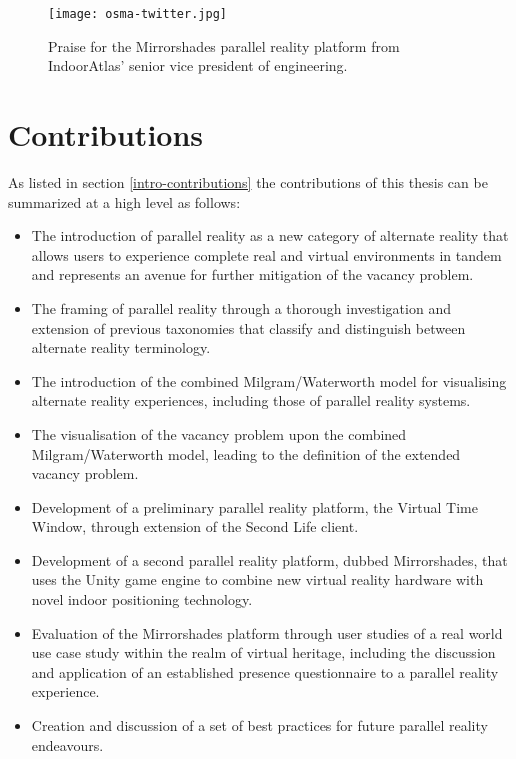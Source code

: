 \begin{figure}[t]
	\begin{center}
		\texttt{[image: osma-twitter.jpg]}
		\caption{Praise for the Mirrorshades parallel reality platform from IndoorAtlas' senior vice president of engineering.}
		\label{osma-twitter.jpg}
	\end{center}	
\end{figure}


\section{Contributions}

As listed in section \ref{intro-contributions} the contributions of this thesis can be summarized at a high level as follows:

\begin{itemize}
	\item The introduction of parallel reality as a new category of alternate reality that allows users to experience complete real and virtual environments in tandem and represents an avenue for further mitigation of the vacancy problem.
	\item The framing of parallel reality through a thorough investigation and extension of previous taxonomies that classify and distinguish between alternate reality terminology.
	\item The introduction of the combined Milgram/Waterworth model for visualising alternate reality experiences, including those of parallel reality systems.
	\item The visualisation of the vacancy problem upon the combined Milgram/Waterworth model, leading to the definition of the extended vacancy problem.
	\item Development of a preliminary parallel reality platform, the Virtual Time Window, through extension of the Second Life client.
	\item Development of a second parallel reality platform, dubbed Mirrorshades, that uses the Unity game engine to combine new virtual reality hardware with novel indoor positioning technology.
	\item Evaluation of the Mirrorshades platform through user studies of a real world use case study within the realm of virtual heritage, including the discussion and application of an established presence questionnaire to a parallel reality experience.
	\item Creation and discussion of a set of best practices for future parallel reality endeavours.
\end{itemize}

